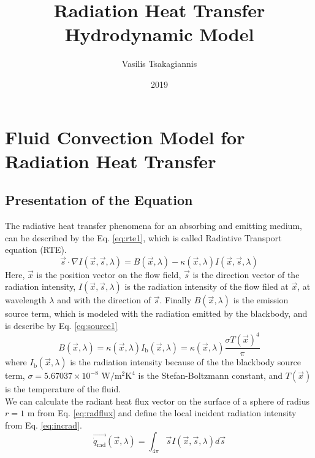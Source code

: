 \documentclass{warpdoc}
\author{
  Vasilis Tsakagiannis
}
\title{
  Radiation Heat Transfer Hydrodynamic Model  
}
\date{
  2019
}
\begin{document}
  \pagestyle{headings}
  \setcounter{page}{1}
  \makewarpdoctitle
  \makeabstract
  \tableofcontents

  \makenomenclature




\section{Fluid Convection Model for Radiation Heat Transfer}
\subsection{Presentation of the Equation}
The radiative heat transfer phenomena for an absorbing and emitting medium, can be described by the Eq. \eqref{eq:rte1}, which is called Radiative Transport equation (RTE).
\begin{equation}
    \Vec{s}\cdot \nabla I(\Vec{x},\Vec{s},\lambda)=B(\Vec{x},\lambda)-\kappa(\Vec{x},\lambda)I(\Vec{x},\Vec{s},\lambda)
    \label{eq:rte1}
\end{equation}
Here, $\Vec{x}$ is the position vector on the flow field, $\Vec{s}$ is the direction vector of the radiation intensity, $I(\Vec{x},\Vec{s},\lambda)$ is the radiation intensity of the flow filed at $\Vec{x}$, at wavelength $\lambda$ and with the direction of $\Vec{s}$. Finally $B(\Vec{x},\lambda)$ is the emission source term, which is modeled with the radiation emitted by the blackbody, and is describe by Eq. \eqref{eq:source1}
\begin{equation}
    B(\Vec{x},\lambda)=\kappa(\Vec{x},\lambda)I_\text{b}(\Vec{x},\lambda)=\kappa(\Vec{x},\lambda)\frac{\sigma T(\Vec{x})^4}{\pi}
    \label{eq:source1}
\end{equation}
where $I_\text{b}(\Vec{x},\lambda)$ is the radiation intensity because of the  the blackbody source term, $\sigma=5.67037\times 10^{-8}$  ${\text{W}/\text{m}^2\text{K}^4}$ is the Stefan-Boltzmann constant, and $T(\Vec{x})$ is the temperature of the fluid.
\\
We can calculate the radiant heat flux vector on the surface of a sphere of radius $r=1$ m from Eq. \eqref{eq:radflux} and define the local incident radiation intensity from Eq. \eqref{eq:incrad}.
\begin{equation}
    \Vec{\dot{q}_\text{rad}}(\Vec{x},\lambda)=\int_{4\pi}^{} \Vec{s}I(\Vec{x},\Vec{s},\lambda)d\Vec{s}
    \label{eq:radflux}
\end{equation}
\end{document}
